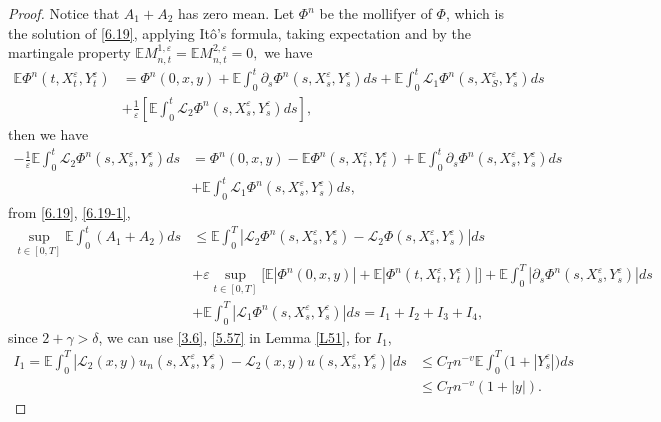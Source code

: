 \documentclass[10pt,a4paper]{amsart}
\begin{document}
\begin{proof}
Notice that $A_{1}+A_{2}$  has  zero mean.
Let $\Phi^{n}$ be the mollifyer of $\Phi$, which is the solution of \eqref{6.19}, applying It\^{o}'s formula, taking expectation and by the martingale property $\mathbb{E}M_{n,t}^{1,\varepsilon}=\mathbb{E}M_{n,t}^{2,\varepsilon}=0,$ we have
\begin{align*}
	\mathbb{E}\Phi^{n}(t,X_{t}^{\varepsilon},Y_{t}^{\varepsilon})	&=\Phi^{n}(0,x,y)+\mathbb{E}\int_{0}^{t}\partial_{s}\Phi^{n}(s,X_{s}^{\varepsilon},Y_{s}^{\varepsilon})ds+\mathbb{E}\int_{0}^{t} \mathcal{L}_{1}\Phi^{n}(s,X_{S}^{\varepsilon},Y_{s}^{\varepsilon})ds\\
	&+\frac{1}{\varepsilon}\left[ \mathbb{E}\int_{0}^{t}\mathcal{L}_{2}\Phi^{n}(s,X_{s}^{\varepsilon},Y_{s}^{\varepsilon})ds\right],
\end{align*}
then we have
\begin{align*}
	-\frac{1}{\varepsilon} \mathbb{E}\int_{0}^{t}\mathcal{L}_{2}\Phi^{n}(s,X_{s}^{\varepsilon},Y_{s}^{\varepsilon})ds&	=\Phi^{n}(0,x,y)-\mathbb{E}\Phi^{n}(s,X_{t}^{\varepsilon},Y_{t}^{\varepsilon})+\mathbb{E}\int_{0}^{t}\partial_{s}\Phi^{n}(s,X_{s}^{\varepsilon},Y_{s}^{\varepsilon})ds\\
	&+\mathbb{E}\int_{0}^{t} \mathcal{L}_{1}\Phi^{n}(s,X_{s}^{\varepsilon},Y_{s}^{\varepsilon})ds,
\end{align*}
from \eqref{6.19}, \eqref{6.19-1}, 
\begin{align*}
	\sup_{t\in [0,T]}\mathbb{E}\int_{0}^{t}\left(A_{1}+A_{2}\right)ds	&\leq\mathbb{E} \int_{0}^{T}\left|\mathcal{L}_{2}\Phi^{n}(s,X_{s}^{\varepsilon},Y_{s}^{\varepsilon})-\mathcal{L}_{2}\Phi(s,X_{s}^{\varepsilon},Y_{s}^{\varepsilon})\right|ds\\
	&+\varepsilon\sup_{t\in [0,T]}\big[ \mathbb{E}|\Phi^{n}(0,x,y)|+\mathbb{E}|\Phi^{n}(t,X_{t}^{\varepsilon},Y_{t}^{\varepsilon})|\big]  +\mathbb{E}\int_{0}^{T}|\partial_{s}\Phi^{n}(s,X_{s}^{\varepsilon},Y_{s}^{\varepsilon})|ds\\
	&+\mathbb{E}\int_{0}^{T} |\mathcal{L}_{1}\Phi^{n}(s,X_{s}^{\varepsilon},Y_{s}^{\varepsilon})|ds=I_{1}+I_{2}+I_{3}+I_{4},
\end{align*}
since $2+\gamma> \delta$, we can use \eqref{3.6}, \eqref{5.57} in Lemma \ref{L51}, for $I_{1}$, 
\begin{align*}
	I_{1}=\mathbb{E} \int_{0}^{T}\left|\mathcal{L}_{2}(x,y)u_{n}(s,X_{s}^{\varepsilon},Y_{s}^{\varepsilon})-\mathcal{L}_{2}(x,y)u(s,X_{s}^{\varepsilon},Y_{s}^{\varepsilon})\right|ds &\leq C_{T}n^{-v}\mathbb{E}\int_{0}^{T}\big(1+|Y_{s}^{\varepsilon}|\big) ds\\
	&\leq  C_{T}n^{-v}(1+|y|).
\end{align*}


\end{proof}
\end{document}
